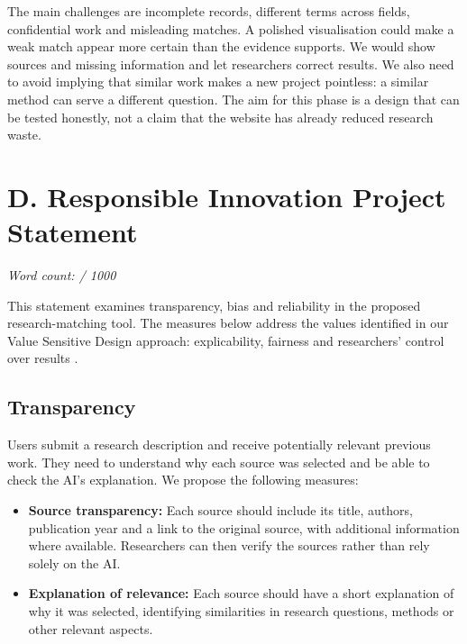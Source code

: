 \documentclass[11pt,a4paper]{article}
\begin{document}
The main challenges are incomplete records, different terms across fields, confidential work and misleading matches. A polished visualisation could make a weak match appear more certain than the evidence supports. We would show sources and missing information and let researchers correct results. We also need to avoid implying that similar work makes a new project pointless: a similar method can serve a different question. The aim for this phase is a design that can be tested honestly, not a claim that the website has already reduced research waste.

\clearpage
\section*{D. Responsible Innovation Project Statement}
\noindent\textit{Word count: \Dwordcount / 1000}\par\medskip
This statement examines transparency, bias and reliability in the proposed research-matching tool. The measures below address the values identified in our Value Sensitive Design approach: explicability, fairness and researchers' control over results \citep{friedman2008}.

\subsection*{Transparency}
Users submit a research description and receive potentially relevant previous work. They need to understand why each source was selected and be able to check the AI's explanation. We propose the following measures:
\begin{itemize}[leftmargin=*]
    \item \textbf{Source transparency:} Each source should include its title, authors, publication year and a link to the original source, with additional information where available. Researchers can then verify the sources rather than rely solely on the AI.
    \item \textbf{Explanation of relevance:} Each source should have a short explanation of why it was selected, identifying similarities in research questions, methods or other relevant aspects.
\end{itemize}
\end{document}

